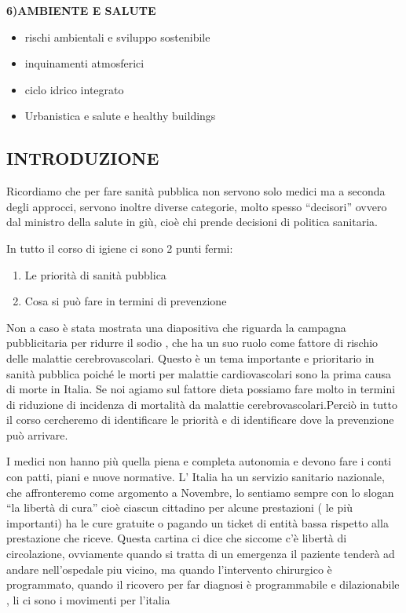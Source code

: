 \textbf{6)AMBIENTE E SALUTE}
\begin{itemize}

\item rischi ambientali e sviluppo sostenibile

\item inquinamenti atmosferici

\item ciclo idrico integrato

\item Urbanistica e salute e healthy buildings
\end{itemize}
\subsection{INTRODUZIONE}


Ricordiamo che per fare sanità pubblica non servono solo medici ma a
seconda degli approcci, servono inoltre diverse categorie, molto spesso
``decisori'' ovvero dal ministro della salute in giù, cioè chi prende
decisioni di politica sanitaria.

In tutto il corso di igiene ci sono 2 punti fermi:

\begin{enumerate}
\def\labelenumi{\arabic{enumi})}
\item
  Le priorità di sanità pubblica
\item
  Cosa si può fare in termini di prevenzione
\end{enumerate}

  Non a caso è stata mostrata una diapositiva che riguarda la campagna
  pubblicitaria per ridurre il sodio , che ha un suo ruolo come fattore
  di rischio delle malattie cerebrovascolari. Questo è un tema
  importante e prioritario in sanità pubblica poiché le morti per
  malattie cardiovascolari sono la prima causa di morte in Italia. Se
  noi agiamo sul fattore dieta possiamo fare molto in termini di
  riduzione di incidenza di mortalità da malattie
  cerebrovascolari.Perciò in tutto il corso cercheremo di identificare
  le priorità e di identificare dove la prevenzione può arrivare.

  I medici non hanno più quella piena e completa autonomia e devono fare
  i conti con patti, piani e nuove normative. L' Italia ha un servizio
  sanitario nazionale, che affronteremo come argomento a Novembre, lo
  sentiamo sempre con lo slogan ``la libertà di cura'' cioè ciascun
  cittadino per alcune prestazioni ( le più importanti) ha le cure
  gratuite o pagando un ticket di entità bassa rispetto alla prestazione
  che riceve. Questa cartina ci dice che siccome c'è libertà di
  circolazione, ovviamente quando si tratta di un emergenza il paziente
  tenderà ad andare nell'ospedale piu vicino, ma quando l'intervento
  chirurgico è programmato, quando il ricovero per far diagnosi è
  programmabile e dilazionabile , li ci sono i movimenti per l'italia


